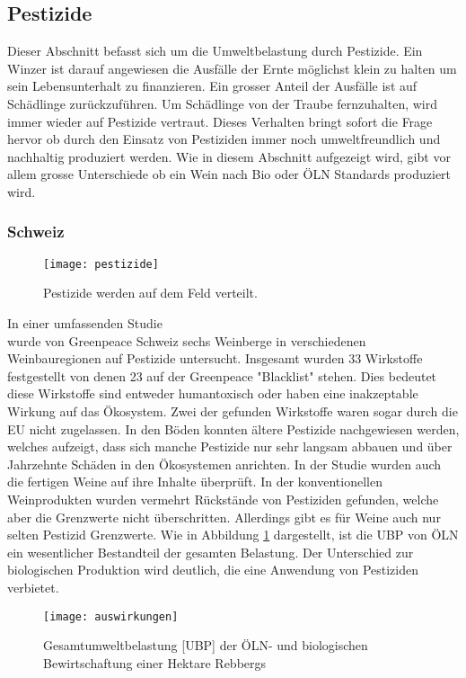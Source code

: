 \subsection{Pestizide}
Dieser Abschnitt befasst sich um die Umweltbelastung durch Pestizide. Ein Winzer ist darauf
angewiesen die Ausfälle der Ernte möglichst klein zu halten um sein Lebensunterhalt zu finanzieren.
Ein grosser Anteil der Ausfälle ist auf Schädlinge zurückzuführen. Um Schädlinge von der Traube
fernzuhalten, wird immer wieder auf Pestizide vertraut. Dieses Verhalten bringt sofort die Frage
hervor ob durch den Einsatz von Pestiziden immer noch umweltfreundlich und nachhaltig produziert
werden. Wie in diesem Abschnitt aufgezeigt wird, gibt vor allem grosse Unterschiede ob ein Wein nach Bio oder ÖLN Standards produziert wird.
\subsubsection{Schweiz}
\begin{wrapfigure}{r}{10cm}
	\texttt{[image: pestizide]}
	\caption{Pestizide werden auf dem Feld verteilt.}
\end{wrapfigure}
In einer umfassenden Studie\\\cite{_reportweintesting-1.pdf} wurde von Greenpeace Schweiz sechs
Weinberge in verschiedenen Weinbauregionen auf Pestizide untersucht. Insgesamt wurden 33 Wirkstoffe
festgestellt von denen 23 auf der Greenpeace "Blacklist" stehen. Dies bedeutet diese Wirkstoffe sind
entweder humantoxisch oder haben eine inakzeptable Wirkung auf das Ökosystem. Zwei der gefunden
Wirkstoffe waren sogar durch die EU nicht zugelassen. In den Böden konnten ältere Pestizide
nachgewiesen werden, welches aufzeigt,  dass sich manche Pestizide nur sehr langsam abbauen und über
Jahrzehnte Schäden in den Ökosystemen anrichten. In der Studie wurden auch die fertigen Weine auf
ihre Inhalte überprüft. In der konventionellen Weinprodukten wurden vermehrt Rückstände von
Pestiziden gefunden, welche aber die Grenzwerte nicht überschritten. Allerdings gibt es für Weine auch nur selten Pestizid Grenzwerte. Wie in Abbildung \ref{fig:ha} dargestellt, ist die UBP von ÖLN ein wesentlicher Bestandteil der gesamten Belastung. Der Unterschied zur biologischen Produktion wird deutlich, die eine Anwendung von Pestiziden verbietet.
 \begin{figure}[H]	
	\centering
	\texttt{[image: auswirkungen]}
	\caption{Gesamtumweltbelastung [UBP] der ÖLN- und biologischen Bewirtschaftung einer Hektare Rebbergs}
	\label{fig:ha}
\end{figure}

